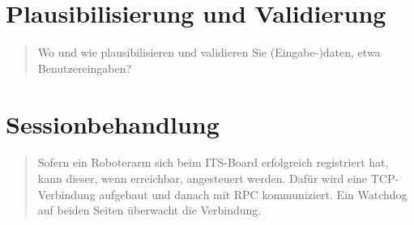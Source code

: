 
\section{Plausibilisierung und Validierung}
\begin{quote}
	Wo und wie plausibilisieren und validieren Sie (Eingabe-)daten, etwa Benutzereingaben?
\end{quote}

\section{Sessionbehandlung}
\begin{quote}
	Sofern ein Roboterarm sich beim ITS-Board erfolgreich registriert hat, kann dieser, wenn erreichbar, angesteuert werden. Dafür wird eine TCP-Verbindung aufgebaut und danach mit RPC kommuniziert. Ein Watchdog auf beiden Seiten überwacht die Verbindung.
\end{quote}

